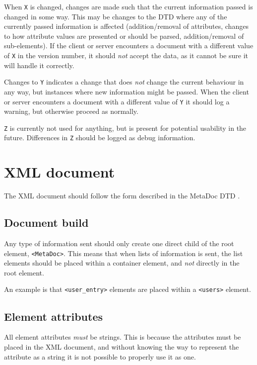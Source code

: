 \documentclass[titlepage, a4paper,10pt]{article}
\begin{document}
When \texttt{X} is changed, changes are made such that the current information
passed is changed in some way. This may be changes to the DTD where any of the
currently passed information is affected (addition/removal of attributes,
changes to how attribute values are presented or should be parsed,
addition/removal of sub-elements). If the client or server encounters a
document with a different value of \texttt{X} in the version number, it should
\textit{not} accept the data, as it cannot be sure it will handle it correctly.

Changes to \texttt{Y} indicates a change that does \textit{not} change the
current behaviour in any way, but instances where new information might be
passed. When the client or server encounters a document with a different value
of \texttt{Y} it should log a warning, but otherwise proceed as normally.

\texttt{Z} is currently not used for anything, but is present for potential
usability in the future. Differences in \texttt{Z} should be logged as debug
information.

\newpage
\section{XML document}
\label{sec:xmldoc}

The XML document should follow the form described in the MetaDoc DTD 
\cite{metadoc_dtd}. 

\subsection{Document build}

Any type of information sent should only create one direct child of the root
element, \texttt{<MetaDoc>}. This means that when lists of information is sent, 
the list elements should be placed within a container element, and \textit{not} 
directly in the root element.

An example is that \texttt{<user\_entry>} elements are placed within a
\texttt{<users>} element. 

\subsection{Element attributes}

All element attributes \textit{must} be strings. This is because the attributes 
must be placed in the XML document, and without knowing the way to represent the 
attribute as a string it is not possible to properly use it as one.
\end{document}
